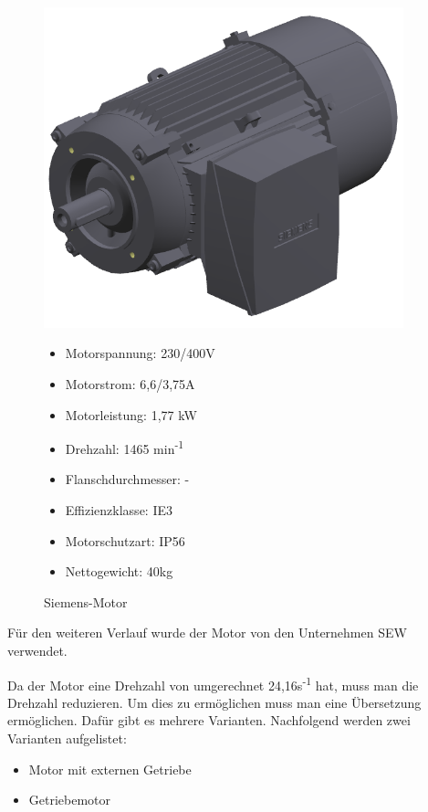\begin{figure}[!ht]
\begin{minipage}[t]{0.45\textwidth}
\includegraphics[width=0.93\textwidth]{SiemensMotor}
\caption{Siemens-Motor}

\begin{itemize}
	\item{Motorspannung: 230/400V}
	\item{Motorstrom: 6,6/3,75A}
	\item{Motorleistung: 1,77 kW}
	\item{Drehzahl: 1465 min\textsuperscript{-1}}
	\item{Flanschdurchmesser: -}
	\item{Effizienzklasse: IE3}
	\item{Motorschutzart: IP56}
	\item{Nettogewicht: 40kg}
\end{itemize}

\end{minipage}
\end{figure}

Für den weiteren Verlauf wurde der Motor von den Unternehmen SEW verwendet.

Da der Motor eine Drehzahl von umgerechnet 24,16s\textsuperscript{-1} hat, muss man die Drehzahl reduzieren. Um dies zu ermöglichen muss man eine Übersetzung ermöglichen. Dafür gibt es mehrere Varianten. Nachfolgend werden zwei Varianten aufgelistet:

\begin{itemize}
	\item{Motor mit externen Getriebe}
	\item{Getriebemotor}
\end{itemize}

